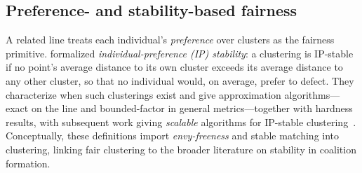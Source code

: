 \subsection{Preference- and stability-based fairness}
A related line treats each individual's \emph{preference} over clusters as the fairness primitive. \citet{ahmadi2022individual} formalized \emph{individual-preference (IP) stability}: a clustering is IP-stable if no point's average distance to its own cluster exceeds its average distance to any other cluster, so that no individual would, on average, prefer to defect. They characterize when such clusterings exist and give approximation algorithms---exact on the line and bounded-factor in general metrics---together with hardness results, with subsequent work giving \emph{scalable} algorithms for IP-stable clustering~\citep{ipstablescalable2024}. Conceptually, these definitions import \emph{envy-freeness} and stable matching into clustering, linking fair clustering to the broader literature on stability in coalition formation.
